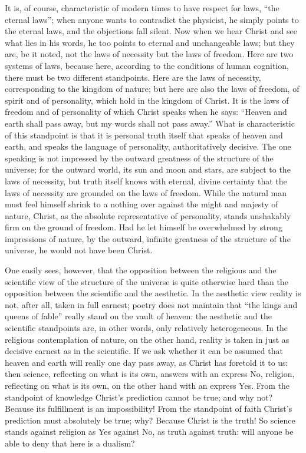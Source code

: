 \documentclass[12pt]{book}
\newcommand{\opage}[1]{\marginnote{\footnotesize\textit{[#1]}}}
\begin{document}
It is, of course, characteristic of modern times to have respect for laws,
``the eternal laws''; when anyone wants to contradict the physicist, he
simply points to the eternal laws, and the objections fall silent. Now when
we hear Christ and see what lies in his words, he too points to eternal and
unchangeable laws; but they are, be it noted, not the laws of necessity but
the laws of freedom. Here are two systems of laws, because here, according
to the conditions of human cognition, there must be two different
standpoints. Here are the laws of necessity, corresponding to the kingdom
of nature; but here are also the laws of freedom, of spirit and of
personality, which hold in the kingdom of Christ. It is the laws of freedom
and of personality of which Christ speaks when he says: ``Heaven and earth
shall pass away, but my words shall not pass away.'' What is
characteristic of this standpoint is that it is personal truth itself that
speaks of heaven and earth, and speaks the language of personality,
authoritatively decisive. The one speaking is not impressed by the outward
greatness of the structure of the universe; for the outward world, its sun
and moon and stars, are subject to the laws of necessity, but truth itself
knows with eternal, divine certainty that the laws of necessity are
\opage{203}\setcounter{footnote}{0}%
grounded on the laws of freedom. While the natural man must feel himself
shrink to a nothing over against the might and majesty of nature, Christ,
as the absolute representative of personality, stands unshakably firm
on the ground of freedom. Had he let himself be overwhelmed by strong
impressions of nature, by the outward, infinite greatness of the structure
of the universe, he would not have been Christ.

One easily sees, however, that the opposition between the religious and the
scientific view of the structure of the universe is quite otherwise hard
than the opposition between the scientific and the aesthetic. In the
aesthetic view reality is not, after all, taken in full earnest; poetry
does not maintain that ``the kings and queens of fable'' really stand on
the vault of heaven: the aesthetic and the scientific standpoints are, in
other words, only relatively heterogeneous. In the religious contemplation
of nature, on the other hand, reality is taken in just as decisive earnest
as in the scientific. If we ask whether it can be assumed that heaven and
earth will really one day pass away, as Christ has foretold it to us: then
science, reflecting on what is its own, answers with an express No,
religion, reflecting on what is its own, on the other hand with an express
Yes. From the standpoint of knowledge Christ's prediction cannot be true;
and why not? Because its fulfillment is an impossibility! From the
standpoint of faith Christ's prediction must absolutely be true; why?
Because Christ is the truth! So science stands against religion as Yes
against No, as truth against truth: will anyone be able to deny that here
is a dualism?
\end{document}
